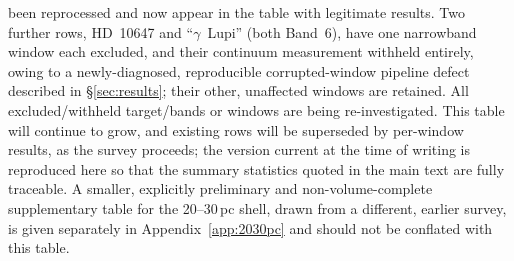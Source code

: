 \documentclass{openjournal}
\begin{document}
been reprocessed and now appear in the table with legitimate results.
Two further rows, HD~10647 and ``$\gamma$~Lupi'' (both Band~6), have one
narrowband window each excluded, and their continuum measurement
withheld entirely, owing to a newly-diagnosed, reproducible
corrupted-window pipeline defect described in \S\ref{sec:results}; their
other, unaffected windows are retained. All excluded/withheld
target/bands or windows are being re-investigated. This table will
continue to grow, and existing rows will be superseded by per-window
results, as the survey proceeds; the version current at the time of
writing is reproduced here so that the summary statistics quoted in the
main text are fully traceable. A smaller, explicitly preliminary and
non-volume-complete supplementary table for the 20--30\,pc shell, drawn
from a different, earlier survey, is given separately in
Appendix~\ref{app:2030pc} and should not be conflated with this table.
\end{document}

